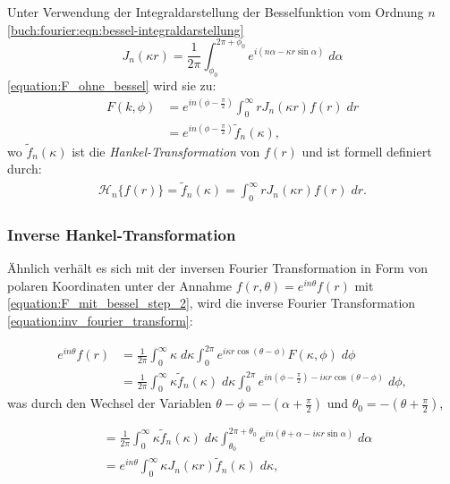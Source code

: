 Unter Verwendung der Integraldarstellung der Besselfunktion vom Ordnung $n$ \eqref{buch:fourier:eqn:bessel-integraldarstellung}
\begin{equation*}
	J_n(\kappa r)=\frac{1}{2\pi}\int_{\phi_{0}}^{2\pi + \phi_{0}}e^{i(n\alpha-\kappa r \sin \alpha)} \; d\alpha
	\label{equation:bessel_n_ordnung}
\end{equation*}
\eqref{equation:F_ohne_bessel} wird sie zu:
\begin{align}
	F(k,\phi)&=e^{in(\phi-\frac{\pi}{2})}\int_{0}^{\infty}rJ_n(\kappa r) f(r) \; dr  \nonumber \\ 
	&=e^{in(\phi-\frac{\pi}{2})}\tilde{f}_n(\kappa),
	\label{equation:F_mit_bessel_step_2}
\end{align}
wo $\tilde{f}_n(\kappa)$ ist die \textit{Hankel-Transformation} von $f(r)$ und ist formell definiert durch:
\begin{align}
	\mathscr{H}_n\{f(r)\}=\tilde{f}_n(\kappa)=\int_{0}^{\infty}rJ_n(\kappa r) f(r) \; dr.
	\label{equation:hankel}
\end{align}

\subsubsection{Inverse Hankel-Transformation \label{subsub:inverse_hankel_tansformation}}
Ähnlich verhält es sich mit der inversen Fourier Transformation in Form von polaren Koordinaten unter der Annahme $f(r,\theta)=e^{in\theta}f(r)$ mit \eqref{equation:F_mit_bessel_step_2}, wird die inverse Fourier Transformation \eqref{equation:inv_fourier_transform}:

\begin{align*}
	e^{in\theta}f(r)&=\frac{1}{2\pi}\int_{0}^{\infty}\kappa \; d\kappa \int_{0}^{2\pi}e^{i\kappa r \cos (\theta - \phi)}F(\kappa,\phi) \; d\phi  \\
	&= \frac{1}{2\pi}\int_{0}^{\infty}\kappa \tilde{f}_n(\kappa) \; d\kappa \int_{0}^{2\pi}e^{in(\phi - \frac{\pi}{2})- i\kappa r \cos (\theta - \phi)} \; d\phi,
\end{align*}
was durch den Wechsel der Variablen $\theta-\phi=-(\alpha+\frac{\pi}{2})$ und $\theta_0=-(\theta+\frac{\pi}{2})$,

\begin{align*}
	&= \frac{1}{2\pi}\int_{0}^{\infty}\kappa \tilde{f}_n(\kappa) \; d\kappa \int_{\theta_0}^{2\pi+\theta_0}e^{in(\theta + \alpha - i\kappa r \sin\alpha)} \; d\alpha \\
	&= e^{in\theta}\int_{0}^{\infty}\kappa J_n(\kappa r) \tilde{f}_n(\kappa) \; d\kappa,
\end{align*}

